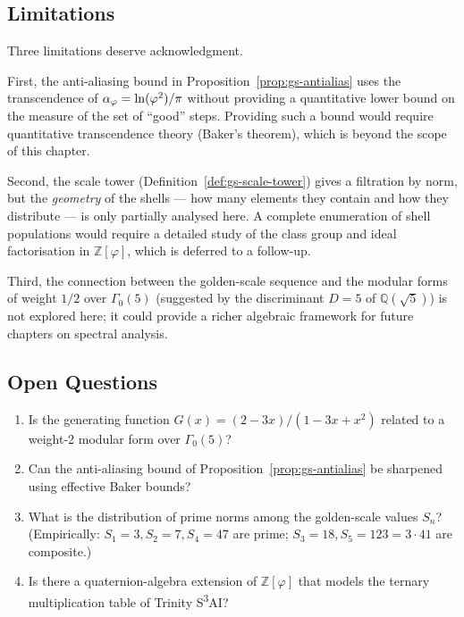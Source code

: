 \subsection{Limitations}
\label{subsec:gs-limits}

Three limitations deserve acknowledgment.

First, the anti-aliasing bound in Proposition~\ref{prop:gs-antialias}
uses the transcendence of \(\alpha_\varphi = \ln(\varphi^{2})/\pi\)
without providing a quantitative lower bound on the measure of the
set of ``good'' steps.  Providing such a bound would require
quantitative transcendence theory (Baker's theorem), which is beyond
the scope of this chapter.

Second, the scale tower (Definition~\ref{def:gs-scale-tower}) gives
a filtration by norm, but the \emph{geometry} of the shells — how
many elements they contain and how they distribute — is only partially
analysed here.  A complete enumeration of shell populations would
require a detailed study of the class group and ideal factorisation
in \(\mathbb{Z}[\varphi]\), which is deferred to a follow-up.

Third, the connection between the golden-scale sequence and the
modular forms of weight \(1/2\) over \(\Gamma_0(5)\) (suggested by
the discriminant \(D = 5\) of \(\mathbb{Q}(\sqrt{5})\)) is
not explored here; it could provide a richer algebraic framework
for future chapters on spectral analysis.

\subsection{Open Questions}
\label{subsec:gs-open}

\begin{enumerate}
  \item Is the generating function \(G(x) = (2-3x)/(1-3x+x^2)\)
        related to a weight-2 modular form over \(\Gamma_0(5)\)?
  \item Can the anti-aliasing bound of Proposition~\ref{prop:gs-antialias}
        be sharpened using effective Baker bounds?
  \item What is the distribution of prime norms among the
        golden-scale values \(S_n\)? (Empirically: \(S_1=3,
        S_2=7, S_4=47\) are prime; \(S_3=18, S_5=123=3\cdot41\) are
        composite.)
  \item Is there a quaternion-algebra extension of \(\mathbb{Z}[\varphi]\)
        that models the ternary multiplication table of
        Trinity S\textsuperscript{3}AI?
\end{enumerate}

